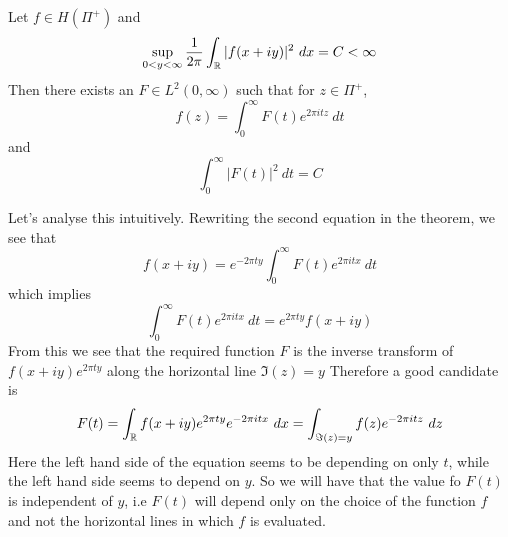 \begin{theorem}
  \label{thm:paley_wiener_in_upper_half_plane}
  Let $f \in H(\Pi^+)$ and $$\sup_{0<y<\infty} \frac{1}{2\pi} \int_\mathbb R |f(x+iy)|^2 \ dx = C < \infty$$
  Then there exists an $F \in L^2(0, \infty)$ such that for $z \in \Pi^+$, $$f(z) = \int_0^\infty F(t)e^{2\pi itz} \ dt$$
  and 
  $$\int_0^\infty |F(t)|^2 \ dt = C $$
\end{theorem}
\begin{note}
  Let's analyse this intuitively. Rewriting the second equation in the theorem, we see that $$f(x+iy) = e^{-2\pi ty}\int_0^\infty F(t) e^{2\pi itx} \ dt $$
  which implies
  $$\int_0^\infty F(t) e^{2\pi itx} \ dt = e^{2\pi t y}f(x+iy)$$
  From this we see that the required function $F$ is the inverse transform of $f(x+iy)e^{2\pi ty}$ along the horizontal line $\Im(z) = y$
  Therefore a good candidate is $$F(t) = \int_\mathbb R f(x+iy)e^{2\pi ty}e^{-2\pi itx} \ dx = \int_{\Im(z) = y} f(z)e^{-2\pi itz} \ dz$$
  Here the left hand side of the equation seems to be depending on only $t$, while the left hand side seems to depend on $y$. So we will have that the value fo $F(t)$ is independent of $y$, i.e $F(t)$ will depend only on the choice of the function $f$ and not the horizontal lines in which $f$ is evaluated.
  \end{note}
